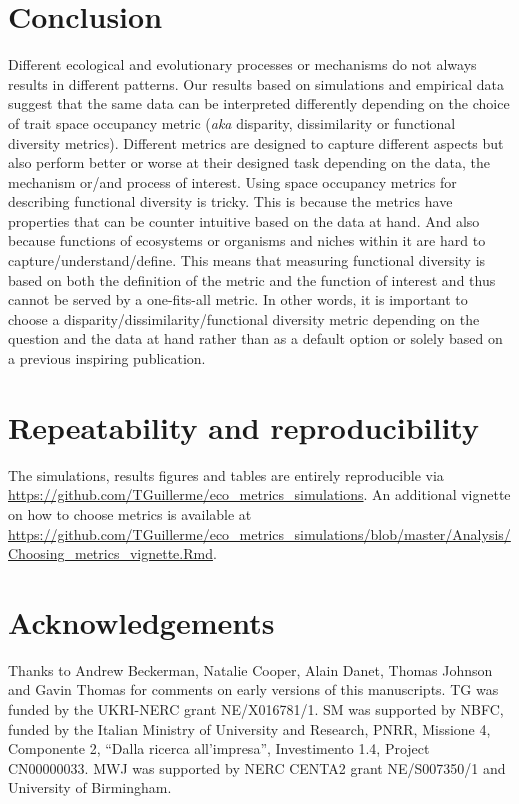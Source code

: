 \documentclass[12pt,letterpaper]{article}
\begin{document}
\section{Conclusion}
Different ecological and evolutionary processes or mechanisms do not always results in different patterns.
Our results based on simulations and empirical data suggest that the same data can be interpreted differently depending on the choice of trait space occupancy metric (\textit{aka} disparity, dissimilarity or functional diversity metrics).
Different metrics are designed to capture different aspects \citep{guillerme2020shifting,mammola2021concepts} but also perform better or worse at their designed task depending on the data, the mechanism or/and process of interest.
Using space occupancy metrics for describing functional diversity is tricky.
This is because the metrics have properties that can be counter intuitive based on the data at hand.
And also because functions of ecosystems or organisms and niches within it are hard to capture/understand/define.
This means that measuring functional diversity is based on both the definition of the metric and the function of interest and thus cannot be served by a one-fits-all metric.
In other words, it is important to choose a disparity/dissimilarity/functional diversity metric depending on the question and the data at hand rather than as a default option or solely based on a previous inspiring publication.


\section{Repeatability and reproducibility}
The simulations, results figures and tables are entirely reproducible via \url{https://github.com/TGuillerme/eco_metrics_simulations}.
An additional vignette on how to choose metrics is available at \url{https://github.com/TGuillerme/eco_metrics_simulations/blob/master/Analysis/Choosing_metrics_vignette.Rmd}.


\section{Acknowledgements}
Thanks to Andrew Beckerman, Natalie Cooper, Alain Danet, Thomas Johnson and Gavin Thomas for comments on early versions of this manuscripts.
TG was funded by the UKRI-NERC grant NE/X016781/1.
SM was supported by NBFC, funded by the Italian Ministry of University and Research, PNRR, Missione 4, Componente 2, ``Dalla ricerca all'impresa'', Investimento 1.4, Project CN00000033.
MWJ was supported by NERC CENTA2 grant NE/S007350/1 and University of Birmingham.





\end{document}
